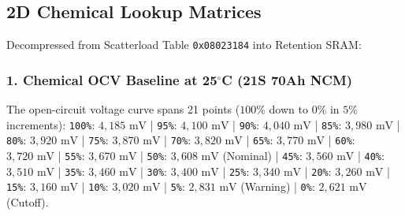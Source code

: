 \documentclass[10pt,a4paper]{article}
\begin{document}
\subsection{2D Chemical Lookup Matrices}
Decompressed from Scatterload Table \texttt{0x08023184} into Retention SRAM:

\subsubsection{1. Chemical OCV Baseline at 25$^\circ$C (21S 70Ah NCM)}
The open-circuit voltage curve spans 21 points ($100\%$ down to $0\%$ in $5\%$ increments):
\texttt{100\%}: $4,185\text{ mV}$ | \texttt{95\%}: $4,100\text{ mV}$ | \texttt{90\%}: $4,040\text{ mV}$ | \texttt{85\%}: $3,980\text{ mV}$ | \texttt{80\%}: $3,920\text{ mV}$ | \texttt{75\%}: $3,870\text{ mV}$ | \texttt{70\%}: $3,820\text{ mV}$ | \texttt{65\%}: $3,770\text{ mV}$ | \texttt{60\%}: $3,720\text{ mV}$ | \texttt{55\%}: $3,670\text{ mV}$ | \texttt{50\%}: $3,608\text{ mV}$ (Nominal) | \texttt{45\%}: $3,560\text{ mV}$ | \texttt{40\%}: $3,510\text{ mV}$ | \texttt{35\%}: $3,460\text{ mV}$ | \texttt{30\%}: $3,400\text{ mV}$ | \texttt{25\%}: $3,340\text{ mV}$ | \texttt{20\%}: $3,260\text{ mV}$ | \texttt{15\%}: $3,160\text{ mV}$ | \texttt{10\%}: $3,020\text{ mV}$ | \texttt{5\%}: $2,831\text{ mV}$ (Warning) | \texttt{0\%}: $2,621\text{ mV}$ (Cutoff).
\end{document}
